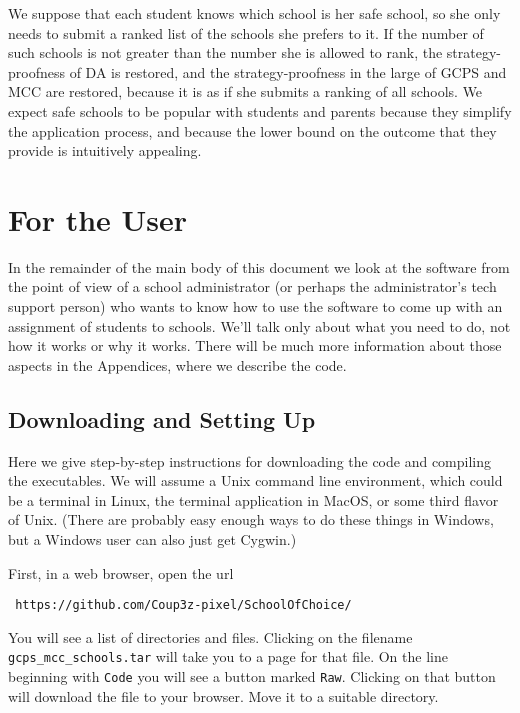 \documentclass[12pt]{article}
\theoremstyle{definition}
\begin{document}
We suppose that each student knows which school is her safe school, so
she only needs to submit a ranked list of the schools she prefers to
it. If the number of such schools is not greater than the number she
is allowed to rank, the strategy-proofness of DA is restored, and the
strategy-proofness in the large of GCPS and MCC are restored, because
it is as if she submits a ranking of all schools.  We expect safe
schools to be popular with students and parents because they simplify
the application process, and because the lower bound on the outcome
that they provide is intuitively appealing.

\section{For the User}

In the remainder of the main body of this document we look at the
software from the point of view of a school administrator (or perhaps
the administrator's tech support person) who wants to know how to use
the software to come up with an assignment of students to schools.
We'll talk only about what you need to do, not how it works or why it
works.  There will be much more information about those aspects in the
Appendices, where we describe the code.

\subsection{Downloading and Setting Up} \label{subsec:DownloadInstall}

Here we give step-by-step instructions for downloading the code and
compiling the executables.  We will assume a Unix command line
environment, which could be a terminal in Linux, the terminal
application in MacOS, or some third flavor of Unix.  (There are
probably easy enough ways to do these things in Windows, but a Windows
user can also just get Cygwin.)

First, in a web browser, open the url
\begin{obeylines}
  \texttt{
    https://github.com/Coup3z-pixel/SchoolOfChoice/
    }
\end{obeylines}

\bigskip \noindent You will see a list of directories and files.
Clicking on the filename \texttt{gcps\_mcc\_schools.tar} will take you
to a page for that file.  On the line beginning with \texttt{Code} you
will see a button marked \texttt{Raw}.  Clicking on that button will
download the file to your browser.  Move it to a suitable directory.
\end{document}
